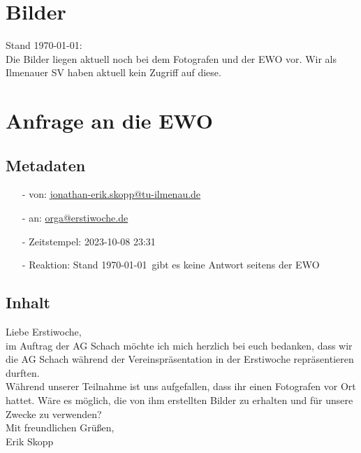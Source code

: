 \documentclass[a4paper,german]{tui-algo-seminar}
\begin{document}
\section{Bilder}
Stand \today: \\
Die Bilder liegen aktuell noch bei dem Fotografen und der EWO vor. Wir als Ilmenauer SV haben aktuell kein Zugriff auf diese. 

\section{Anfrage an die EWO}
\subsection{Metadaten}
\begin{itemize}
    \item[-] von: \hyperlink{mailto:jonathan-erik.skopp@tu-ilmenau.de}{jonathan-erik.skopp@tu-ilmenau.de}
    \item[-] an:  \hyperlink{mailto:orga@erstiwoche.de}{orga@erstiwoche.de}
    \item[-] Zeitstempel:  2023-10-08 23:31
    \item[-] Reaktion: Stand \today ~gibt es keine Antwort seitens der EWO
\end{itemize}

\subsection{Inhalt}
Liebe Erstiwoche,\\
im Auftrag der AG Schach möchte ich mich herzlich bei euch bedanken, dass wir die AG Schach während der Vereinspräsentation in der Erstiwoche repräsentieren durften.\\
Während unserer Teilnahme ist uns aufgefallen, dass ihr einen Fotografen vor Ort hattet. Wäre es möglich, die von ihm erstellten Bilder zu erhalten und für unsere Zwecke zu verwenden?\\
Mit freundlichen Grüßen, \\ 
Erik Skopp\\
\end{document}
